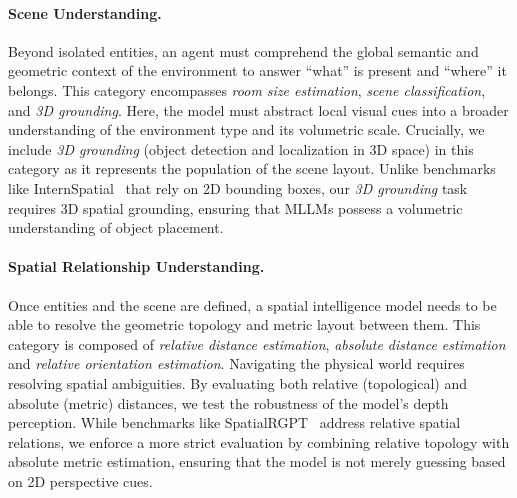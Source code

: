 \paragraph{Scene Understanding.} Beyond isolated entities, an agent must comprehend the global semantic and geometric context of the environment to answer ``what'' is present and ``where'' it belongs.
This category encompasses \textit{room size estimation}, \textit{scene classification}, and \textit{3D grounding}.
Here, the model must abstract local visual cues into a broader understanding of the environment type and its volumetric scale.
Crucially, we include \textit{3D grounding} (object detection and localization in 3D space) in this category as it represents the population of the scene layout.
Unlike benchmarks like InternSpatial~\cite{deng2025internspatial} that rely on 2D bounding boxes, our \textit{3D grounding} task requires 3D spatial grounding, ensuring that MLLMs possess a volumetric understanding of object placement. 



\paragraph{Spatial Relationship Understanding.} Once entities and the scene are defined, a spatial intelligence model needs to be able to resolve the geometric topology and metric layout between them.
This category is composed of \textit{relative distance estimation}, \textit{absolute distance estimation} and \textit{relative orientation estimation}.
Navigating the physical world requires resolving spatial ambiguities. By evaluating both relative (topological) and absolute (metric) distances, we test the robustness of the model's depth perception.
While benchmarks like SpatialRGPT~\cite{cheng2024spatialrgpt} address relative spatial relations, we enforce a more strict evaluation by combining relative topology with absolute metric estimation, ensuring that the model is not merely guessing based on 2D perspective cues.

